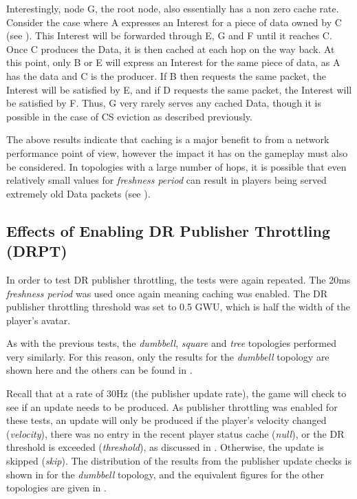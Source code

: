 Interestingly, node G, the root node, also essentially has a non zero cache rate. Consider the case where A expresses an Interest for a piece of data owned by C (see ). This Interest will be forwarded through E, G and F until it reaches C. Once C produces the Data, it is then cached at each hop on the way back. At this point, only B or E will express an Interest for the same piece of data, as A has the data and C is the producer. If B then requests the same packet, the Interest will be satisfied by E, and if D requests the same packet, the Interest will be satisfied by F. Thus, G very rarely serves any cached Data, though it is possible in the case of CS eviction as described previously. 

The above results indicate that caching is a major benefit to \game{} from a network performance point of view, however the impact it has on the gameplay must also be considered. In topologies with a large number of hops, it is possible that even relatively small values for \textit{freshness period} can result in players being served extremely old Data packets (see ).


\subsection{Effects of Enabling DR Publisher Throttling (DRPT)}
In order to test DR publisher throttling, the tests were again repeated. The 20ms \textit{freshness period} was used once again meaning caching was enabled. The DR publisher throttling threshold was set to 0.5 GWU, which is half the width of the player's avatar. 

As with the previous tests, the \textit{dumbbell}, \textit{square} and \textit{tree} topologies performed very similarly. For this reason, only the results for the \textit{dumbbell} topology are shown here and the others can be found in .

Recall that at a rate of 30Hz (the publisher update rate), the game will check to see if an update needs to be produced. As publisher throttling was enabled for these tests, an update will only be produced if the player's velocity changed (\textit{velocity}), there was no entry in the recent player status cache (\textit{null}), or the DR threshold is exceeded (\textit{threshold}), as discussed in . Otherwise, the update is skipped (\textit{skip}). The distribution of the results from the publisher update checks is shown in  for the \textit{dumbbell} topology, and the equivalent figures for the other topologies are given in .

